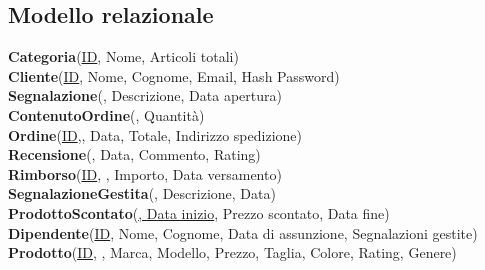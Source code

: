 \subsection{Modello relazionale}

\textbf{Categoria}(\uline{ID}, Nome, Articoli totali)\\
\textbf{Cliente}(\uline{ID}, Nome, Cognome, Email, Hash Password)\\
\textbf{Segnalazione}(, Descrizione, Data apertura)\\
\textbf{ContenutoOrdine}(\uline{}, Quantità)\\
\textbf{Ordine}(\uline{ID},, Data, Totale, Indirizzo spedizione)\\
\textbf{Recensione}(\uline{}, Data, Commento, Rating)\\
\textbf{Rimborso}(\uline{ID}, , Importo, Data versamento)\\
\textbf{SegnalazioneGestita}(\uline{}, Descrizione, Data)\\
\textbf{ProdottoScontato}(\uline{, Data inizio}, Prezzo scontato, Data fine)\\
\textbf{Dipendente}(\uline{ID}, Nome, Cognome, Data di assunzione, Segnalazioni gestite)\\
\textbf{Prodotto}(\uline{ID}, , Marca,  Modello, Prezzo, Taglia, Colore, Rating, Genere)\\
